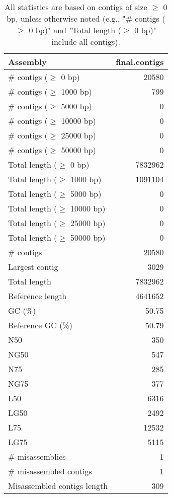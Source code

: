 \documentclass[12pt,a4paper]{article}
\begin{document}
\begin{table}[ht]
\begin{center}
\caption{All statistics are based on contigs of size $\geq$ 0 bp, unless otherwise noted (e.g., "\# contigs ($\geq$ 0 bp)" and "Total length ($\geq$ 0 bp)" include all contigs).}
\begin{tabular}{|l*{1}{|r}|}
\hline
Assembly & final.contigs \\ \hline
\# contigs ($\geq$ 0 bp) & 20580 \\ \hline
\# contigs ($\geq$ 1000 bp) & 799 \\ \hline
\# contigs ($\geq$ 5000 bp) & 0 \\ \hline
\# contigs ($\geq$ 10000 bp) & 0 \\ \hline
\# contigs ($\geq$ 25000 bp) & 0 \\ \hline
\# contigs ($\geq$ 50000 bp) & 0 \\ \hline
Total length ($\geq$ 0 bp) & 7832962 \\ \hline
Total length ($\geq$ 1000 bp) & 1091104 \\ \hline
Total length ($\geq$ 5000 bp) & 0 \\ \hline
Total length ($\geq$ 10000 bp) & 0 \\ \hline
Total length ($\geq$ 25000 bp) & 0 \\ \hline
Total length ($\geq$ 50000 bp) & 0 \\ \hline
\# contigs & 20580 \\ \hline
Largest contig & 3029 \\ \hline
Total length & 7832962 \\ \hline
Reference length & 4641652 \\ \hline
GC (\%) & 50.75 \\ \hline
Reference GC (\%) & 50.79 \\ \hline
N50 & 350 \\ \hline
NG50 & 547 \\ \hline
N75 & 285 \\ \hline
NG75 & 377 \\ \hline
L50 & 6316 \\ \hline
LG50 & 2492 \\ \hline
L75 & 12532 \\ \hline
LG75 & 5115 \\ \hline
\# misassemblies & 1 \\ \hline
\# misassembled contigs & 1 \\ \hline
Misassembled contigs length & 309 \\ \hline

\end{tabular}
\end{center}
\end{table}
\end{document}
